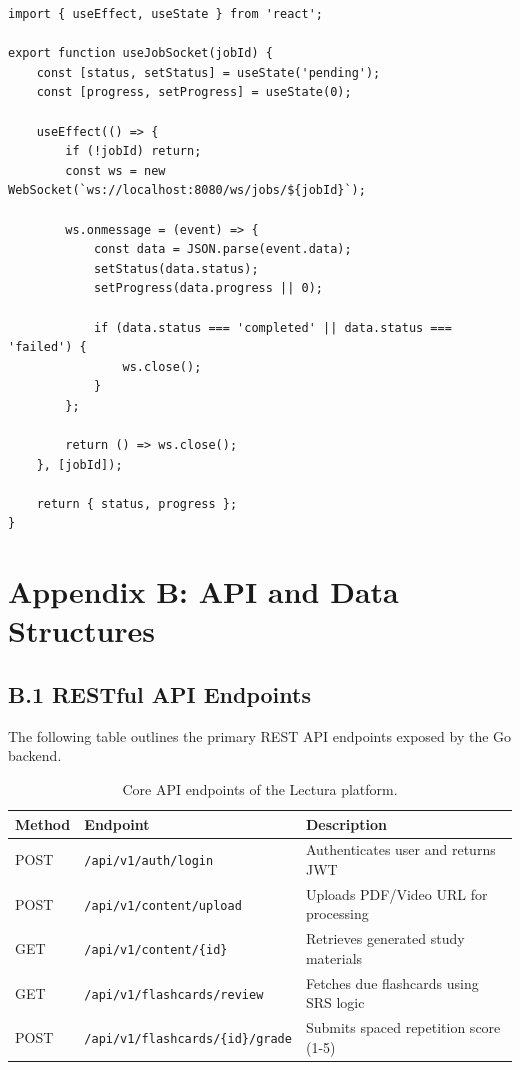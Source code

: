\begin{lstlisting}[caption=React WebSocket Hook]
import { useEffect, useState } from 'react';

export function useJobSocket(jobId) {
    const [status, setStatus] = useState('pending');
    const [progress, setProgress] = useState(0);

    useEffect(() => {
        if (!jobId) return;
        const ws = new WebSocket(`ws://localhost:8080/ws/jobs/${jobId}`);
        
        ws.onmessage = (event) => {
            const data = JSON.parse(event.data);
            setStatus(data.status);
            setProgress(data.progress || 0);
            
            if (data.status === 'completed' || data.status === 'failed') {
                ws.close();
            }
        };

        return () => ws.close();
    }, [jobId]);

    return { status, progress };
}
\end{lstlisting}

\chapter{Appendix B: API and Data Structures}

\section*{B.1 RESTful API Endpoints}
The following table outlines the primary REST API endpoints exposed by the Go backend.

\begin{table}[h]
\centering
\begin{tabular}{|l|l|l|}
\hline
\textbf{Method} & \textbf{Endpoint} & \textbf{Description} \\ \hline
POST & \texttt{/api/v1/auth/login} & Authenticates user and returns JWT \\ \hline
POST & \texttt{/api/v1/content/upload} & Uploads PDF/Video URL for processing \\ \hline
GET  & \texttt{/api/v1/content/\{id\}} & Retrieves generated study materials \\ \hline
GET  & \texttt{/api/v1/flashcards/review} & Fetches due flashcards using SRS logic \\ \hline
POST & \texttt{/api/v1/flashcards/\{id\}/grade} & Submits spaced repetition score (1-5) \\ \hline
\end{tabular}
\caption{Core API endpoints of the Lectura platform.}
\end{table}

